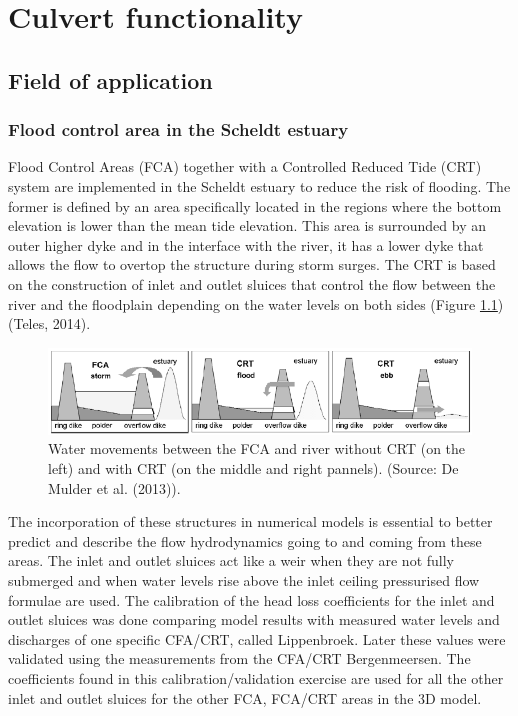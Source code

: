 \chapter{Culvert functionality}

\section{Field of application}

\subsection{Flood control area in the Scheldt estuary}
Flood Control Areas (FCA) together with a Controlled Reduced Tide (CRT) system
are implemented in the Scheldt estuary to reduce the risk of flooding.
The former is defined by an area specifically located in the regions where
the bottom elevation is lower than the mean tide elevation.
This area is surrounded by an outer higher dyke and in the interface with the river,
it has a lower dyke that allows the flow to overtop the structure during storm surges.
The CRT is based on the construction of inlet and outlet sluices that control the
flow between the river and the floodplain depending on the water levels on both
sides (Figure \ref{fig:culvert_fig1}) (Teles, 2014).

\begin{figure}[H]
\begin{center}
  \includegraphics[scale=0.7]{culvert_fig1.png}
\end{center}
\caption{Water movements between the FCA and river without
CRT (on the left) and with CRT (on the middle and right pannels).
(Source: De Mulder et al. (2013)).}
\label{fig:culvert_fig1}
\end{figure}

The incorporation of these structures in numerical models is essential
to better predict and describe the flow hydrodynamics going to and
coming from these areas. The inlet and outlet sluices act like a weir
when they are not fully submerged and when water levels rise above the
inlet ceiling pressurised flow formulae are used.
The calibration of the head loss coefficients for the inlet and outlet sluices
was done comparing model results with measured water levels and discharges of
one specific CFA/CRT, called Lippenbroek.
Later these values were validated using the measurements from the CFA/CRT Bergenmeersen.
The coefficients found in this calibration/validation exercise are used for all the
other inlet and outlet sluices for the other FCA, FCA/CRT areas in the 3D model.

